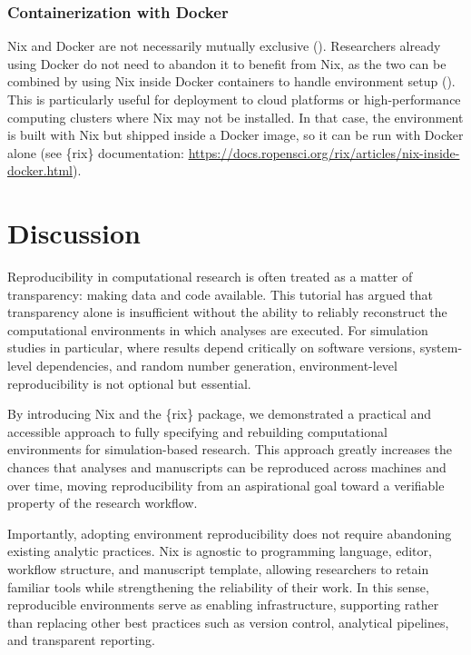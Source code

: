 \documentclass[
  man,
  longtable,
  nolmodern,
  notxfonts,
  notimes,
  colorlinks=true,linkcolor=blue,citecolor=blue,urlcolor=blue]{apa7}
\begin{document}
\subsubsection{Containerization with
Docker}\label{containerization-with-docker}

Nix and Docker are not necessarily mutually exclusive
(). Researchers already using Docker do not need to abandon it to
benefit from Nix, as the two can be combined by using Nix inside Docker
containers to handle environment setup
().
This is particularly useful for deployment to cloud platforms or
high-performance computing clusters where Nix may not be installed. In
that case, the environment is built with Nix but shipped inside a Docker
image, so it can be run with Docker alone (see \{rix\} documentation:
\url{https://docs.ropensci.org/rix/articles/nix-inside-docker.html}).

\section{Discussion}\label{discussion}

Reproducibility in computational research is often treated as a matter
of transparency: making data and code available. This tutorial has
argued that transparency alone is insufficient without the ability to
reliably reconstruct the computational environments in which analyses
are executed. For simulation studies in particular, where results depend
critically on software versions, system-level dependencies, and random
number generation, environment-level reproducibility is not optional but
essential.

By introducing Nix and the \{rix\} package, we demonstrated a practical
and accessible approach to fully specifying and rebuilding computational
environments for simulation-based research. This approach greatly
increases the chances that analyses and manuscripts can be reproduced
across machines and over time, moving reproducibility from an
aspirational goal toward a verifiable property of the research workflow.

Importantly, adopting environment reproducibility does not require
abandoning existing analytic practices. Nix is agnostic to programming
language, editor, workflow structure, and manuscript template, allowing
researchers to retain familiar tools while strengthening the reliability
of their work. In this sense, reproducible environments serve as
enabling infrastructure, supporting rather than replacing other best
practices such as version control, analytical pipelines, and transparent
reporting.
\end{document}
